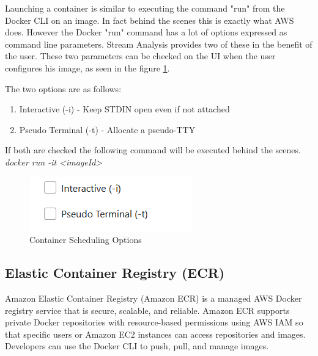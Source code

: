 \newpage

Launching a container is similar to executing the command "run" from the Docker CLI on an image. In fact behind the scenes this is exactly what AWS does. However the Docker "run" command has a lot of options expressed as command line parameters. Stream Analysis provides two of these in the benefit of the user. These two parameters can be checked on the UI when the user configures his image, as seen in the figure \ref{fig:dockerOptions}.

The two options are as follows:

\begin{enumerate}
	\item Interactive (-i) - Keep STDIN open even if not attached
	\item Pseudo Terminal (-t) - Allocate a pseudo-TTY
\end{enumerate}

If both are checked the following command will be executed behind the scenes.\\

\textit{docker run -it <imageId>}\\

\begin{figure}[h]
	\centering
	\includegraphics[width=1\linewidth]{./images/webapp/dockerOptions.PNG}
	\caption{Container Scheduling Options}
	\label{fig:dockerOptions}
\end{figure}

\newpage

\subsection{Elastic Container Registry (ECR)}
\label{chap:04:03:02}

Amazon Elastic Container Registry (Amazon ECR) is a managed AWS Docker registry service that is secure, scalable, and reliable. Amazon ECR supports private Docker repositories with resource-based permissions using AWS IAM so that specific users or Amazon EC2 instances can access repositories and images. Developers can use the Docker CLI to push, pull, and manage images.\cite{aws-ecr}

